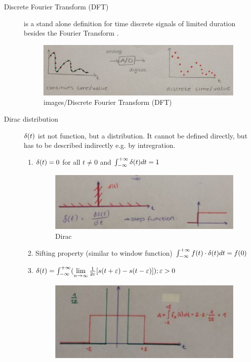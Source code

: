 \begin{description}
	\item[Discrete Fourier Transform (DFT)] is a stand alone definition for time discrete signals of limited duration besides the Fourier Transform .
		\begin{figure}[!h]
			\centering
			\includegraphics[width=0.7\linewidth]{images/DFT}
			\caption[Discrete Fourier Transform (DFT)]{images/Discrete Fourier Transform (DFT)}
			\label{fig:DFT}
		\end{figure}
	\item[Dirac distribution] $\delta(t)$ ist not function, but a distribution. It cannot be defined directly, but has to be described indirectly e.g. by intregration.
		\begin{enumerate}
			\item $ \delta(t)=0$ for all $t\neq0$ and $\int_{-\infty}^{+\infty}\delta(t) dt = 1 $
				\begin{figure}[!h]
					\centering
					\includegraphics[width=0.7\linewidth]{images/dirac1}
					\caption{Dirac}
					\label{fig:dirac1}
				\end{figure}
			\item Sifting property (similar to window function)
			$\int_{-\infty}^{+\infty} f(t) \cdot \delta(t) dt = f(0) $
			\item $\delta(t) = \int_{-\infty}^{+\infty}(\lim\limits_{n \to \infty} \frac{1}{2\varepsilon}[s(t+\varepsilon)-s(t-\varepsilon)] ); \varepsilon>0 $
				\begin{figure}[!h]
					\centering
					\includegraphics[width=0.7\linewidth]{images/dirac2}

\end{figure}
\end{enumerate}
\end{description}
